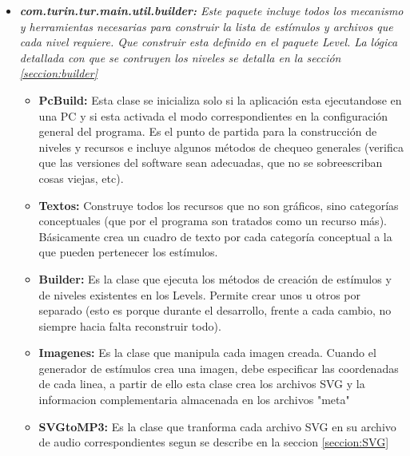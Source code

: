 \documentclass{article}
\numberwithin{figure}{section}
\begin{document}
\begin{itemize}
        \item \textit{\textbf{com.turin.tur.main.util.builder:} Este paquete incluye todos los mecanismo y herramientas necesarias para construir la lista de estímulos y archivos que cada nivel requiere. Que construir esta definido en el paquete Level. La lógica detallada con que se contruyen los niveles se detalla en la sección \ref{seccion:builder}}
        \begin{itemize}
            \item \textbf{PcBuild:} Esta clase se inicializa solo si la aplicación esta ejecutandose en una PC y si esta activada el modo correspondientes en la configuración general del programa. Es el punto de partida para la construcción de niveles y recursos e incluye algunos métodos de chequeo generales (verifica que las versiones del software sean adecuadas, que no se sobreescriban cosas viejas, etc). 
            \item \textbf{Textos:} Construye todos los recursos que no son gráficos, sino categorías conceptuales (que por el programa son tratados como un recurso más). Básicamente crea un cuadro de texto por cada categoría conceptual a la que pueden pertenecer los estímulos. 
            \item \textbf{Builder:} Es la clase que ejecuta los métodos de creación de estímulos y de niveles existentes en los Levels. Permite crear unos u otros por separado (esto es porque durante el desarrollo, frente a cada cambio, no siempre hacia falta reconstruir todo).
            \item \textbf{Imagenes:} Es la clase que manipula cada imagen creada. Cuando el generador de estímulos crea una imagen, debe especificar las coordenadas de cada linea, a partir de ello esta clase crea los archivos SVG y la informacion complementaria almacenada en los archivos "meta"
            \item \textbf{SVGtoMP3:} Es la clase que tranforma cada archivo SVG en su archivo de audio correspondientes segun se describe en la seccion \ref{seccion:SVG}
        \end{itemize}
        

\end{itemize}
\end{document}
